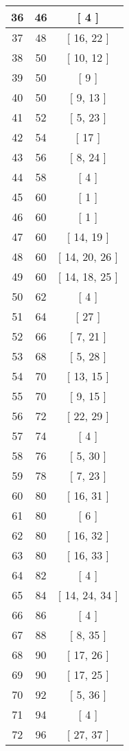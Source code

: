 \begin{center}
\begin{longtable}[H]{|| c c c ||}
\hline
36 & 46 & [ 4 ] \\ 
\hline
37 & 48 & [ 16, 22 ] \\ 
\hline
38 & 50 & [ 10, 12 ] \\ 
\hline
39 & 50 & [ 9 ] \\ 
\hline
40 & 50 & [ 9, 13 ] \\ 
\hline
41 & 52 & [ 5, 23 ] \\ 
\hline
42 & 54 & [ 17 ] \\ 
\hline
43 & 56 & [ 8, 24 ] \\ 
\hline
44 & 58 & [ 4 ] \\ 
\hline
45 & 60 & [ 1 ] \\ 
\hline
46 & 60 & [ 1 ] \\ 
\hline
47 & 60 & [ 14, 19 ] \\ 
\hline
48 & 60 & [ 14, 20, 26 ] \\ 
\hline
49 & 60 & [ 14, 18, 25 ] \\ 
\hline
50 & 62 & [ 4 ] \\ 
\hline
51 & 64 & [ 27 ] \\ 
\hline
52 & 66 & [ 7, 21 ] \\ 
\hline
53 & 68 & [ 5, 28 ] \\ 
\hline
54 & 70 & [ 13, 15 ] \\ 
\hline
55 & 70 & [ 9, 15 ] \\ 
\hline
56 & 72 & [ 22, 29 ] \\ 
\hline
57 & 74 & [ 4 ] \\ 
\hline
58 & 76 & [ 5, 30 ] \\ 
\hline
59 & 78 & [ 7, 23 ] \\ 
\hline
60 & 80 & [ 16, 31 ] \\ 
\hline
61 & 80 & [ 6 ] \\ 
\hline
62 & 80 & [ 16, 32 ] \\ 
\hline
63 & 80 & [ 16, 33 ] \\ 
\hline
64 & 82 & [ 4 ] \\ 
\hline
65 & 84 & [ 14, 24, 34 ] \\ 
\hline
66 & 86 & [ 4 ] \\ 
\hline
67 & 88 & [ 8, 35 ] \\ 
\hline
68 & 90 & [ 17, 26 ] \\ 
\hline
69 & 90 & [ 17, 25 ] \\ 
\hline
70 & 92 & [ 5, 36 ] \\ 
\hline
71 & 94 & [ 4 ] \\ 
\hline
72 & 96 & [ 27, 37 ] \\ 

\end{longtable}
\end{center}

